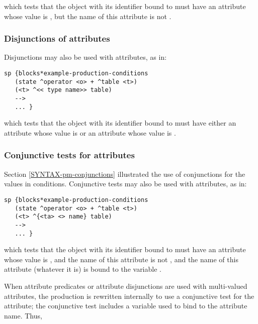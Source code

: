 which tests that the object with its identifier bound to  must have
an attribute whose value is , but the name of this attribute is
not .

\subsubsection*{Disjunctions of attributes}
\index{<< >>}

Disjunctions may also be used with attributes, as in:

\begin{verbatim}
sp {blocks*example-production-conditions
   (state ^operator <o> + ^table <t>)
   (<t> ^<< type name>> table)
   -->
   ... }
\end{verbatim}

which tests that the object with its identifier bound to  must have
either an attribute  whose value is  or an attribute
 whose value is .

\subsubsection*{Conjunctive tests for attributes}

Section \ref{SYNTAX-pm-conjunctions} illustrated the use of conjunctions for
the values in conditions. Conjunctive tests may also be used with attributes,
as in:

\begin{verbatim}
sp {blocks*example-production-conditions
   (state ^operator <o> + ^table <t>)
   (<t> ^{<ta> <> name} table)
   -->
   ... }
\end{verbatim}

which tests that the object with its identifier bound to  must have
an attribute whose value is , and the name of this attribute is
not , and the name of this attribute (whatever it is) is bound to
the variable .

When attribute predicates or attribute disjunctions are used with
multi-valued attributes, the production is rewritten internally to use a
conjunctive test for the attribute; the conjunctive test includes a
variable used to bind to the attribute name. Thus,

